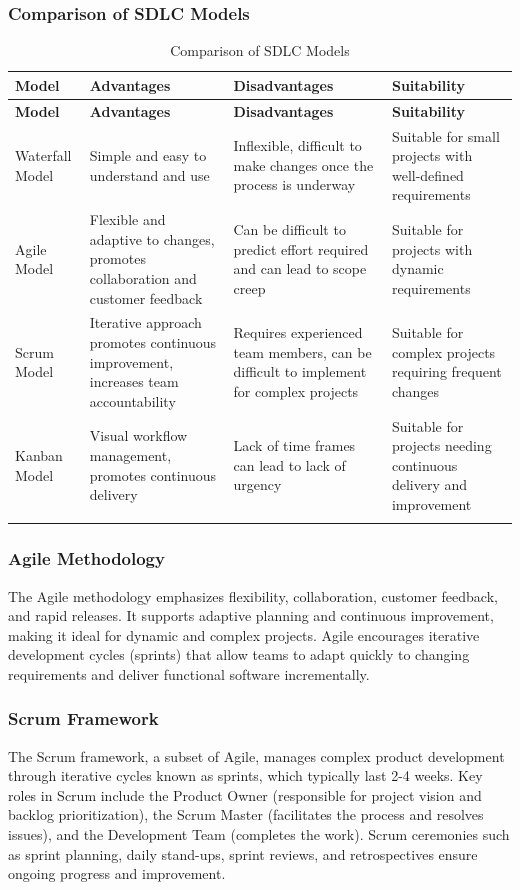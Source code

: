 \subsubsection{Comparison of SDLC Models}

\begin{longtable}{|m{3cm}|m{4cm}|m{4cm}|m{4cm}|}
\hline
\textbf{Model} & \textbf{Advantages} & \textbf{Disadvantages} & \textbf{Suitability} \\
\hline
\endfirsthead
\hline
\textbf{Model} & \textbf{Advantages} & \textbf{Disadvantages} & \textbf{Suitability} \\
\hline
\endhead
Waterfall Model & Simple and easy to understand and use & Inflexible, difficult to make changes once the process is underway & Suitable for small projects with well-defined requirements \\
\hline
Agile Model & Flexible and adaptive to changes, promotes collaboration and customer feedback & Can be difficult to predict effort required and can lead to scope creep & Suitable for projects with dynamic requirements \\
\hline
Scrum Model & Iterative approach promotes continuous improvement, increases team accountability & Requires experienced team members, can be difficult to implement for complex projects & Suitable for complex projects requiring frequent changes \\
\hline
Kanban Model & Visual workflow management, promotes continuous delivery & Lack of time frames can lead to lack of urgency & Suitable for projects needing continuous delivery and improvement \\
\hline
\caption{Comparison of SDLC Models}
\label{tab:sdlc_models}
\end{longtable}

\subsubsection{Agile Methodology}
The Agile methodology emphasizes flexibility, collaboration, customer feedback, and rapid releases. It supports adaptive planning and continuous improvement, making it ideal for dynamic and complex projects. Agile encourages iterative development cycles (sprints) that allow teams to adapt quickly to changing requirements and deliver functional software incrementally.

\subsubsection{Scrum Framework}
The Scrum framework, a subset of Agile, manages complex product development through iterative cycles known as sprints, which typically last 2-4 weeks. Key roles in Scrum include the Product Owner (responsible for project vision and backlog prioritization), the Scrum Master (facilitates the process and resolves issues), and the Development Team (completes the work). Scrum ceremonies such as sprint planning, daily stand-ups, sprint reviews, and retrospectives ensure ongoing progress and improvement.

